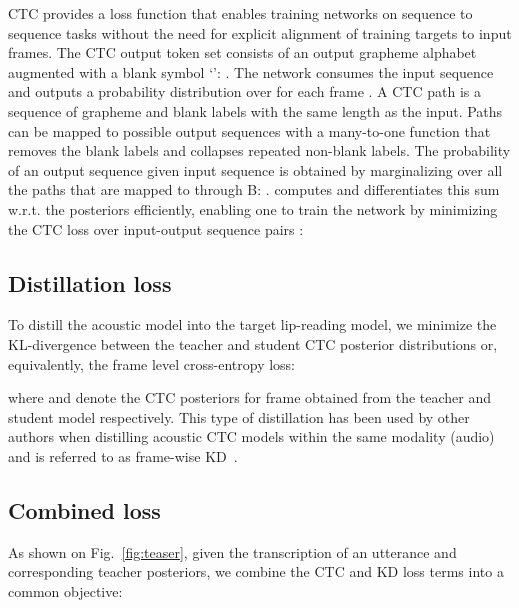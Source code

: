 \documentclass{article}
\def\psec{\vspace{-4pt}}
\begin{document}
CTC
provides a loss function that enables training networks on sequence to sequence
tasks without the need for explicit alignment of training targets to input frames.
The CTC output token set  consists of an output grapheme alphabet  augmented with a blank
symbol `': .  The network consumes the input sequence
and outputs a probability distribution  over  for each frame .
A CTC path   is a sequence of grapheme and blank labels with the same length  as
the input.
Paths  can be mapped to possible output sequences with a many-to-one function  that removes the
blank labels and collapses repeated non-blank labels.
The probability of an output sequence  given input sequence  is
obtained by marginalizing over all the paths that are mapped to  through B: 
.
\cite{Graves06} computes and differentiates this sum w.r.t. the posteriors  efficiently, enabling one to train the network
by minimizing the CTC loss over input-output sequence pairs : 













\psec
\psec
\psec
\subsection{Distillation loss} 
\psec

To distill the acoustic model into the target lip-reading model,
we minimize the KL-divergence between the teacher and student CTC posterior distributions
or, equivalently, the frame level cross-entropy loss:
\psec

where  and  denote the CTC posteriors for frame  obtained from the teacher and student model
respectively.
This type of distillation has been used by other authors when distilling acoustic CTC models within
the same modality (audio) and is referred to as frame-wise
KD~\cite{takashima2019investigation,sak2015acoustic,kim2017improved}. 

\psec
\psec
\psec
\subsection{Combined loss} 
\psec
As shown on Fig.~\ref{fig:teaser}, given the transcription of an utterance and corresponding teacher
posteriors, we combine the CTC and KD loss terms into a common objective:
\psec
\vspace{-2pt}                              
\end{document}
